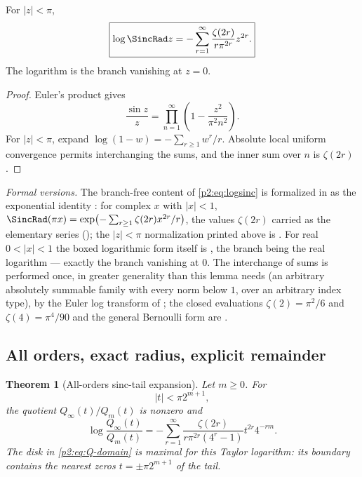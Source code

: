 \documentclass[11pt,oneside]{article}
\numberwithin{equation}{section}
\newtheorem{theorem}{Theorem}[section]
\theoremstyle{definition}
\theoremstyle{remark}
\begin{document}
\begin{lemma}
\label{p2:lem:logsinc}
For $|z|<\pi$,
\begin{equation}
 \boxed{
 \log\SincRad z
 =-\sum_{r=1}^{\infty}\frac{\zeta(2r)}{r\pi^{2r}}z^{2r}.}
 \label{p2:eq:logsinc}
\end{equation}
The logarithm is the branch vanishing at $z=0$.
\end{lemma}

\begin{proof}
Euler's product gives
\[
 \frac{\sin z}{z}=\prod_{n=1}^{\infty}
 \left(1-\frac{z^2}{\pi^2n^2}\right).
\]
For $|z|<\pi$, expand $\log(1-w)=-\sum_{r\ge1}w^r/r$.  Absolute local uniform
convergence permits interchanging the sums, and the inner sum over $n$ is $\zeta(2r)$.
\end{proof}

\emph{Formal versions.}  The branch-free content of \eqref{p2:eq:logsinc} is formalized in
 as the exponential identity
: for complex $x$ with $|x|<1$,
$\SincRad(\pi x)=\exp\bigl(-\sum_{r\ge1}\zeta(2r)x^{2r}/r\bigr)$, the values $\zeta(2r)$ carried
as the elementary series  (); the $|z|<\pi$
normalization printed above is .  For real $0<|x|<1$ the
boxed logarithmic form itself is , the branch being the
real logarithm --- exactly the branch vanishing at $0$.  The interchange of sums is performed
once, in greater generality than this lemma needs (an arbitrary absolutely summable family
with every norm below $1$, over an arbitrary index type), by the Euler log transform
 of ; the closed
evaluations $\zeta(2)=\pi^2/6$ and $\zeta(4)=\pi^4/90$ and the general Bernoulli form are
.

\subsection{All orders, exact radius, explicit remainder}

\begin{theorem}[All-orders sinc-tail expansion]
\label{p2:thm:all-orders-Q}
Let $m\ge0$.  For
\begin{equation}
 |t|<\pi2^{m+1},
 \label{p2:eq:Q-domain}
\end{equation}
the quotient $Q_\infty(t)/Q_m(t)$ is nonzero and
\begin{equation}
 \boxed{
 \log\frac{Q_\infty(t)}{Q_m(t)}
 =-\sum_{r=1}^{\infty}
 \frac{\zeta(2r)}{r\pi^{2r}(4^r-1)}
 t^{2r}4^{-rm}.}
 \label{p2:eq:Q-all-orders}
\end{equation}
The disk in \eqref{p2:eq:Q-domain} is maximal for this Taylor logarithm: its boundary contains
the nearest zeros $t=\pm\pi2^{m+1}$ of the tail.
\newresult
\end{theorem}
\end{document}
